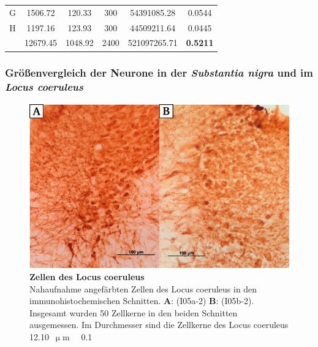 \documentclass[12pt,a4paper,pdftex]{article}
\newcommand{\rpm}{\raisebox{.2ex}{$\scriptstyle\pm$} }
\begin{document}
\begin{table}[H]
{\begin{tabular}{cccccc}
G                                 & 1506.72                                 & 120.33                                   & 300                                    & 54391085.28                                & 0.0544                                     \\
H                                 & 1197.16                                 & 123.93                                   & 300                                    & 44509211.64                                & 0.0445                                     \\\hline
                                  & 12679.45                                & 1048.92                                  & 2400                                   & 521097265.71                               & \textbf{0.5211}                           
\end{tabular}%
}
\end{table}


\subsubsection{Größenvergleich der Neurone in der \textit{Substantia nigra} und im \textit{Locus coeruleus}}

\begin{figure}[H]
    \centering
    \includegraphics{pictures/Bilder_monoamine_systeme/Zellen_LC.png}
    \caption[Zellen des Locus coeruleus]{\textbf{Zellen des Locus coeruleus}\\
    Nahaufnahme angefärbten Zellen des Locus coeruleus in den immunohistochemischen Schnitten. \textbf{A}: (I05a-2) \textbf{B}: (I05b-2). Insgesamt wurden 50 Zellkerne in den beiden Schnitten ausgemessen. Im Durchmesser sind die Zellkerne des Locus coeruleus 12.10~$\upmu$m~\rpm~0.1}
    \label{fig:Zellen_LC}
\end{figure}
\end{document}
